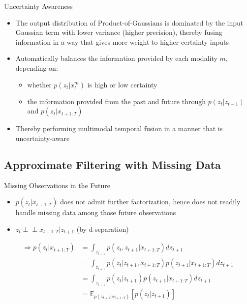 \documentclass{beamer}
\begin{document}
\begin{frame}{Uncertainty Awareness}
\begin{itemize}
\item The output distribution of Product-of-Gaussians is dominated by the input Gaussian term with lower variance (higher precision), thereby fusing information in a way that gives more weight to higher-certainty inputs
\item Automatically balances the information provided by each modality $m$, depending on:
\begin{itemize}
\item whether $p(z_t|x_t^m)$ is high or low certainty
\item the information provided from the past and future through $p(z_t|z_{t-1})$ and $p(z_t|x_{t+1:T})$
\end{itemize}
\item Thereby performing multimodal temporal fusion in a manner that is uncertainty-aware
\end{itemize}
\end{frame}

\subsection{Approximate Filtering with Missing Data}
\begin{frame}{Missing Observations in the Future}
\begin{itemize}
\item $p(z_t|x_{t+1:T})$ does not admit further factorization, hence does not readily handle missing data among those future observations
\item $z_t\perp\!\!\!\perp x_{t+1:T}|z_{t+1}$ (by d-separation)
\end{itemize}
\[
\begin{split}
\Rightarrow p(z_t|x_{t+1:T})&=\int_{z_{t+1}}p(z_t,z_{t+1}|x_{t+1:T})dz_{t+1}\\
&=\int_{z_{t+1}}p(z_t|z_{t+1},x_{t+1:T})p(z_{t+1}|x_{t+1:T})dz_{t+1}\\
&=\int_{z_{t+1}}p(z_t|z_{t+1})p(z_{t+1}|x_{t+1:T})dz_{t+1}\\
&=\mathbb{E}_{p(z_{t+1}|x_{t+1:T})}[p(z_t|z_{t+1})]
\end{split}
\]
\end{frame}
\end{document}
